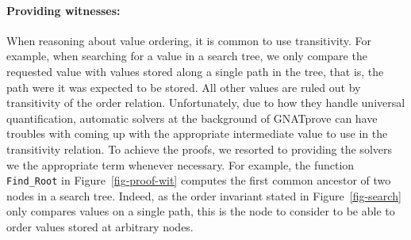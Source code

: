 \documentclass[11pt,a4paper]{article}
\newcommand{\gnatprove}{GNATprove\xspace}
\begin{document}
\paragraph{Providing witnesses:}
When reasoning about value ordering, it is common to use transitivity. For example, when searching for
a value in a search tree, we only compare the requested value with values stored along a single path in
the tree, that is, the path were it was expected to be stored. All other values are ruled out by
transitivity of the order relation. Unfortunately, due to how they handle universal quantification,
automatic solvers at the background of \gnatprove can have troubles with coming up with the appropriate
intermediate value to use in the transitivity relation. To achieve the proofs, we resorted to providing
the solvers we the appropriate term whenever necessary. For example, the function \texttt{Find\_Root} in
Figure~\ref{fig-proof-wit} computes the first common ancestor of two nodes in a search tree. Indeed, as
the order invariant stated in Figure~\ref{fig-search} only compares values on a single path, this
is the node to consider to be able to order values stored at arbitrary nodes.
\end{document}

